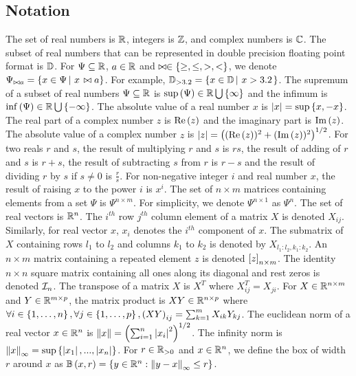 \subsection{Notation}
The set of real numbers is $\mathbb{R}$, integers is $\mathbb{Z}$, and
complex numbers is $\mathbb{C}$.  The subset of real numbers that can be
represented in double precision floating point format is $\mathbb{D}$.
For $\Psi\subseteq\mathbb{R}$, $a\in\mathbb{R}$ and
$\bowtie\in\left\{\geq,\leq,>,<\right\}$, we denote $\Psi_{\bowtie a} = \left\{
  x\in\Psi \left|~x\right. \bowtie a \right\}$.  For example, $\mathbb{D}_{>3.2} =
\left\{x\in\mathbb{D}\left|~x>3.2\right.\right\}$.  The supremum of a subset of real numbers
$\Psi\subseteq\mathbb{R}$ is $\sup\left(\Psi\right)\in\mathbb{R}\bigcup\left\{\infty\right\}$
and the infimum is $\inf\left(\Psi\right)\in\mathbb{R}\bigcup\left\{-\infty\right\}$.  The
absolute value of a real number $x$ is $\left|x\right| = \sup\left\{x,-x\right\}$.
The real part of a complex number $z$ is $\operatorname{Re}\left(z\right)$ and the imaginary
part is $\operatorname{Im}\left(z\right)$.  The absolute value of a complex number $z$ is
$\left|z\right| = \left((\operatorname{Re}\left(z\right))^2 + (\operatorname{Im}\left(z\right))^2\right)^{1/2}$.  For two reals $r$
and $s$, the result of multiplying $r$ and $s$ is $rs$, the result of
adding of $r$ and $s$ is $r+s$, the result of subtracting $s$ from $r$
is $r-s$ and the result of dividing $r$ by $s$ if $s\neq 0$ is
$\frac{r}{s}$.  For non-negative integer $i$ and real number $x$, the
result of raising $x$ to the power $i$ is $x^i$.  The set of $n\times
m$ matrices containing elements from a set $\Psi$ is $\Psi^{n\times
  m}$.  For simplicity, we denote $\Psi^{n\times 1}$ as $\Psi^n$.  The
set of real vectors is $\mathbb{R}^n$.  The $i^{th}$ row $j^{th}$ column
element of a matrix $X$ is denoted $X_{ij}$.  Similarly, for real
vector $x$, $x_i$ denotes the $i^{th}$ component of $x$.  The
submatrix of $X$ containing rows $l_1$ to $l_2$ and columns $k_1$ to
$k_2$ is denoted by $X_{l_1:l_2,k_1:k_2}$.  An $n\times m$ matrix
containing a repeated element $z$ is denoted $\left[z\right]_{n\times m}$.
The identity $n\times n$ square matrix containing all ones along its
diagonal and rest zeros is denoted $\mathcal{I}_{n}$.  The transpose of a
matrix $X$ is $X^T$ where $X^T_{ij} = X_{ji}$.  For
$X\in\mathbb{R}^{n\times m}$ and $Y\in\mathbb{R}^{m\times p}$, the matrix
product is $XY\in\mathbb{R}^{n\times p}$ where $\forall
i\in\left\{1,\ldots,n\right\},\forall j\in\left\{1,\ldots,p\right\},\left(XY\right)_{ij} =
\sum_{k=1}^{m}X_{ik}Y_{kj}$.  The euclidean norm of a real vector
$x\in\mathbb{R}^n$ is $\left\|x\right\| = \left(\sum_{i=1}^n\left|x_i\right|^2\right)^{1/2}$.
The infinity norm is $\left\|x\right\|_\infty =
\sup\left\{\left|x_1\right|,...,\left|x_n\right|\right\}$.  For $r\in\mathbb{R}_{> 0}$ and
$x\in\mathbb{R}^n$, we define the box of width $r$ around $x$ as
$\mathbb{B}\left(x,r\right) = \left\{ y\in\mathbb{R}^n: \left\|y - x\right\|_\infty \leq r \right\}$.

